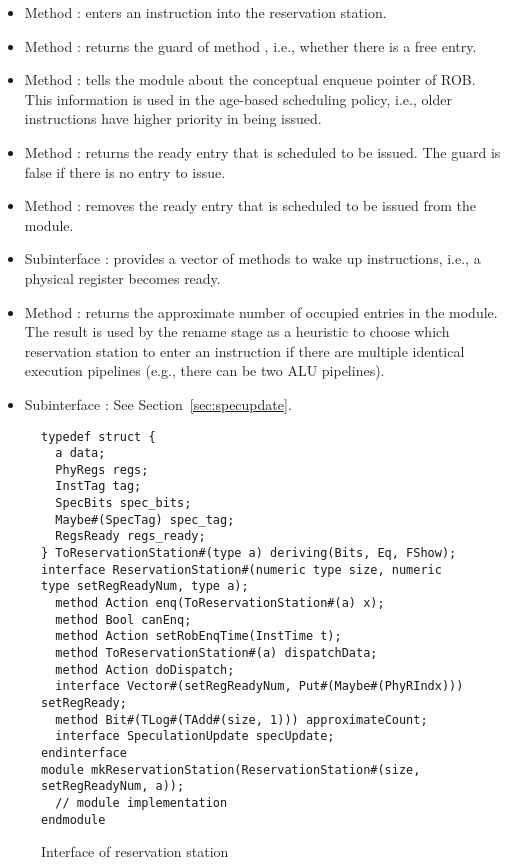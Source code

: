 \begin{itemize}
    \item Method : enters an instruction into the reservation station.
    \item Method : returns the guard of method , i.e., whether there is a free entry.
    \item Method : tells the module about the conceptual enqueue pointer of ROB.
    This information is used in the age-based scheduling policy, i.e., older instructions have higher priority in being issued.
    \item Method : returns the ready entry that is scheduled to be issued.
    The guard is false if there is no entry to issue.
    \item Method : removes the ready entry that is scheduled to be issued from the module.
    \item Subinterface : provides a vector of methods to wake up instructions, i.e., a physical register becomes ready.
    \item Method : returns the approximate number of occupied entries in the module.
    The result is used by the rename stage as a heuristic to choose which reservation station to enter an instruction if there are multiple identical execution pipelines (e.g., there can be two ALU pipelines).
    \item Subinterface : See Section~\ref{sec:specupdate}.
\end{itemize}

\begin{figure}[t]
\begin{lstlisting}[caption={}]
typedef struct {
  a data;
  PhyRegs regs;
  InstTag tag;
  SpecBits spec_bits;
  Maybe#(SpecTag) spec_tag;
  RegsReady regs_ready;
} ToReservationStation#(type a) deriving(Bits, Eq, FShow);
interface ReservationStation#(numeric type size, numeric type setRegReadyNum, type a);
  method Action enq(ToReservationStation#(a) x);
  method Bool canEnq;
  method Action setRobEnqTime(InstTime t);
  method ToReservationStation#(a) dispatchData;
  method Action doDispatch;
  interface Vector#(setRegReadyNum, Put#(Maybe#(PhyRIndx))) setRegReady;
  method Bit#(TLog#(TAdd#(size, 1))) approximateCount;
  interface SpeculationUpdate specUpdate;
endinterface
module mkReservationStation(ReservationStation#(size, setRegReadyNum, a));
  // module implementation
endmodule
\end{lstlisting}
\caption{Interface of reservation station}\label{fig:rs-ifc}
\end{figure}

